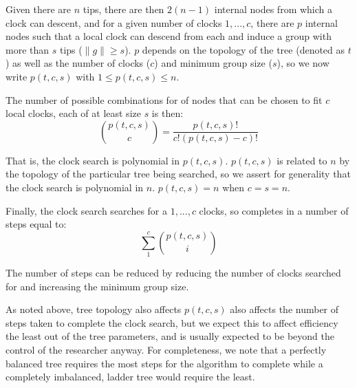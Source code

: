 \documentclass{article}
\begin{document}
Given there are $n$ tips, there are then $2(n-1)$ internal nodes from which a clock can descent, and for a given number of clocks $1,...,c$, there are $p$ internal nodes such that a local clock can descend from each and induce a group with more than $s$ tips ($\|g\| \ge s$). $p$ depends on the topology of the tree (denoted as $t$) as well as the number of clocks ($c$) and minimum group size ($s$), so we now write $p(t,c,s)$ with $1 \le p(t,c,s) \le n$.

The number of possible combinations for of nodes that can be chosen to fit $c$ local clocks, each of at least size $s$ is then:
\begin{equation}
    \binom{p(t,c,s)}{c} = \frac{p(t,c,s)!}{c!(p(t,c,s)-c)!}
\end{equation}

That is, the clock search is polynomial in $p(t,c,s)$. $p(t,c,s)$ is related to $n$ by the topology of the particular tree being searched, so we assert for generality that the clock search is polynomial in $n$. $p(t,c,s) = n$ when $c = s = n$.

Finally, the clock search searches for a $1,...,c$ clocks, so completes in a number of steps equal to:
\begin{equation}
    \sum_{1}^{c} \binom{p(t,c,s)}{i}
\end{equation}

The number of steps can be reduced by reducing the number of clocks searched for and increasing the minimum group size.

As noted above, tree topology also affects $p(t,c,s)$ also affects the number of steps taken to complete the clock search, but we expect this to affect efficiency the least out of the tree parameters, and is usually expected to be beyond the control of the researcher anyway. For completeness, we note that a perfectly balanced tree requires the most steps for the algorithm to complete while a completely imbalanced, ladder tree would require the least.
\end{document}
